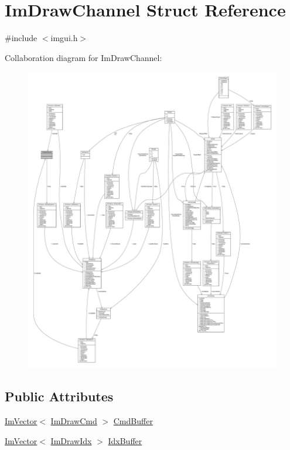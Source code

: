 \hypertarget{struct_im_draw_channel}{}\section{Im\+Draw\+Channel Struct Reference}
\label{struct_im_draw_channel}


{\ttfamily \#include $<$imgui.\+h$>$}



Collaboration diagram for Im\+Draw\+Channel\+:
\nopagebreak
\begin{figure}[H]
\begin{center}
\leavevmode
\includegraphics[width=350pt]{struct_im_draw_channel__coll__graph}
\end{center}
\end{figure}
\subsection*{Public Attributes}
\begin{DoxyCompactItemize}
\item 
\mbox{\hyperlink{class_im_vector}{Im\+Vector}}$<$ \mbox{\hyperlink{struct_im_draw_cmd}{Im\+Draw\+Cmd}} $>$ \mbox{\hyperlink{struct_im_draw_channel_abdaa17053d55fb6757c1971d410ceddf}{Cmd\+Buffer}}
\item 
\mbox{\hyperlink{class_im_vector}{Im\+Vector}}$<$ \mbox{\hyperlink{imgui_8h_afdc8744a5ac1a968b1ddfa47e13b2fa1}{Im\+Draw\+Idx}} $>$ \mbox{\hyperlink{struct_im_draw_channel_a7fbed7d3523124fadd94859d5ac0fd67}{Idx\+Buffer}}
\end{DoxyCompactItemize}


